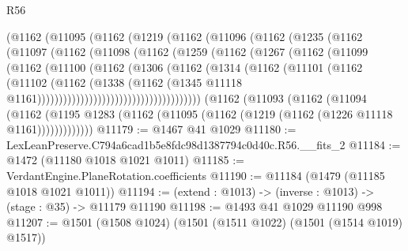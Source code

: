 \begin{lexlean}{R56}
\begin{coremodule}
                  (@1162
                    (@11095
                      (@1162
                        (@1219
                          (@1162
                            (@11096
                              (@1162
                                (@1235
                                  (@1162
                                    (@11097
                                      (@1162
                                        (@11098
                                          (@1162
                                            (@1259
                                              (@1162
                                                (@1267
                                                  (@1162
                                                    (@11099
                                                      (@1162
                                                        (@11100
                                                          (@1162
                                                            (@1306
                                                              (@1162
                                                                (@1314
                                                                  (@1162
                                                                    (@11101
                                                                      (@1162
                                                                        (@11102
                                                                          (@1162
                                                                            (@1338
                                                                              (@1162
                                                                                (@1345
                                                                                  @11118
                                                                                  @1161))))))))))))))))))))))))))))))))))))))
      (@1162
        (@11093
          (@1162
            (@11094
              (@1162
                (@1195 @1283 (@1162 (@11095 (@1162 (@1219 (@1162 (@1226 @11118 @1161)))))))))))))
@11179 := @1467 @41 @1029
@11180 := LexLeanPreserve.C794a6cad1b5e8fdc98d1387794c0d40c.R56.__fits_2
@11184 := @1472 (@11180 @1018 @1021 @1011)
@11185 := VerdantEngine.PlaneRotation.coefficients
@11190 := @11184 (@1479 (@11185 @1018 @1021 @1011))
@11194 := (extend : @1013) -> (inverse : @1013) -> (stage : @35) -> @11179 @11190
@11198 := @1493 @41 @1029 @11190 @998
@11207 := @1501 (@1508 @1024) (@1501 (@1511 @1022) (@1501 (@1514 @1019) @1517))

\end{coremodule}
\end{lexlean}
